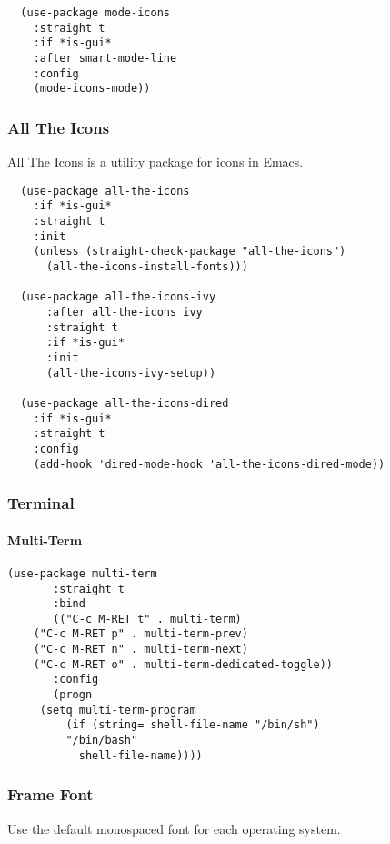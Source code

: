 \documentclass[11pt]{article}
\begin{document}
\begin{verbatim}
  (use-package mode-icons
    :straight t
    :if *is-gui*
    :after smart-mode-line
    :config
    (mode-icons-mode))
\end{verbatim}

\subsubsection*{All The Icons}
\label{sec:org56c5fc9}

\href{https://github.com/domtronn/all-the-icons.el}{All The Icons} is a utility package for icons in Emacs.

\begin{verbatim}
  (use-package all-the-icons
    :if *is-gui*
    :straight t
    :init
    (unless (straight-check-package "all-the-icons")
      (all-the-icons-install-fonts)))

  (use-package all-the-icons-ivy
      :after all-the-icons ivy
      :straight t
      :if *is-gui*
      :init
      (all-the-icons-ivy-setup))

  (use-package all-the-icons-dired
    :if *is-gui*
    :straight t
    :config
    (add-hook 'dired-mode-hook 'all-the-icons-dired-mode))
\end{verbatim}

\subsubsection*{Terminal}
\label{sec:orgcb06822}
\paragraph*{Multi-Term}
\label{sec:orgddaffe8}

\begin{verbatim}
(use-package multi-term
       :straight t
       :bind
       (("C-c M-RET t" . multi-term)
	("C-c M-RET p" . multi-term-prev)
	("C-c M-RET n" . multi-term-next)
	("C-c M-RET o" . multi-term-dedicated-toggle))
       :config
       (progn
	 (setq multi-term-program
	     (if (string= shell-file-name "/bin/sh")
		 "/bin/bash"
	       shell-file-name))))
\end{verbatim}

\subsubsection*{Frame Font}
\label{sec:org8425f88}

Use the default monospaced font for each operating system.
\end{document}
